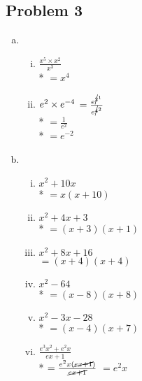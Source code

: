 \documentclass[a4paper]{article}
\begin{document}
  \subsection*{Problem 3}
  \begin{enumerate}[a)]
    \item \begin{enumerate}[i.]
      \item $\frac{x^{5} \times x^{2}}{x^{3}}$\\*\vspace*{5px}
      $= x^{4}$

      \item $e^{2} \times e^{-4}\\*$\vspace*{5px}
      $= \frac{e^{\cancel{2}^{1}}}{e^{\cancel{4}^{2}}}$\\*\vspace*{5px}
      $= \frac{1}{e^{2}}$\\*
      $= e^{-2}$
    \end{enumerate}
    \item \begin{enumerate}[i.]
      \item $x^{2}+10x$\\*
      $=x(x+10)$\vspace*{5px}

      \item $x^2 + 4x + 3$\\*
      $=(x+3)(x+1)$\vspace*{5px}

      \item $x^2 + 8x + 16$\\
      $=(x+4)(x+4)$\vspace*{5px}

      \item $x^2 - 64$\\*
      $= (x-8)(x+8)$\vspace*{5px}

      \item $x^2 - 3x - 28$\\*
      $= (x-4)(x+7)$\vspace*{5px}

      \item $\frac{e^3x^2+e^2x}{ex+1}$\\*\vspace*{5px}
      $= \frac{e^2x(\cancel{ex+1})}{\cancel{ex+1}}\\*$\vspace*{5px}
      $=e^2x$
    \end{enumerate}
  \end{enumerate}
\end{document}
